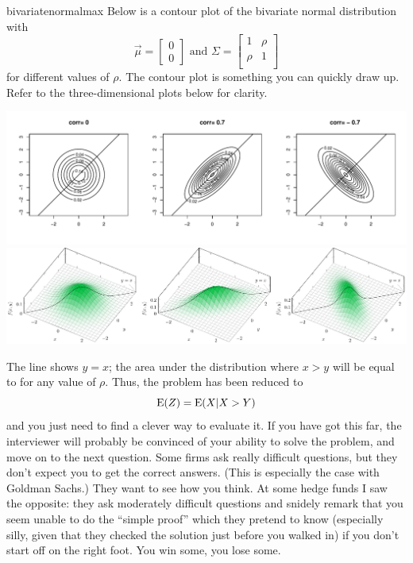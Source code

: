 \begin{answer}{bivariatenormalmax}
Below is a contour plot of the bivariate normal distribution with
\[
\vec{\mu}=
\begin{bmatrix}
  0    \\
  0
\end{bmatrix}
\text{ and }
\Sigma =
\begin{bmatrix}
  1    & \rho \\
  \rho & 1    \\
\end{bmatrix}
\]
for different values of $\rho$.
The contour plot is something you can quickly draw up.
Refer to the three-dimensional plots below for clarity.
\begin{center}
  \includegraphics[width=\textwidth]{./plots/mvtnorm/mvrnorm.pdf}
  \includegraphics[width=\textwidth]{./plots/bivariatenorm/bivariatenorm.pdf}
\end{center}
The line shows $y=x$; the area under the distribution where $x>y$ will be equal to  for any value of $\rho$.
Thus, the problem has been reduced to
\[
\operatorname{\mathrm{E}}(Z) =  \operatorname{\mathrm{E}}(X|X > Y)
\]
and you just need to find a clever way to evaluate it.
If you have got this far, the interviewer will probably be convinced of your ability to solve the problem, and move on to the next question.
Some firms  ask really difficult questions, but they don't expect you to get the correct answers.
(This is especially the case with Goldman Sachs.)
They want to see how you think.
At some hedge funds I saw the opposite: they ask moderately difficult questions and snidely remark that you seem unable to do the ``simple proof'' which they pretend to know (especially silly, given that they checked the solution just before you walked in) if you don't start off on the right foot.
You win some, you lose some.


\end{answer}

